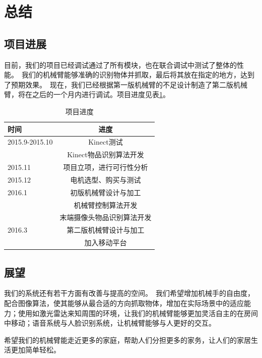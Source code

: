 \section{总结}

\subsection{项目进展}

目前，我们的项目已经调试通过了所有模块，也在联合调试中测试了整体的性能。\ 我们的机械臂能够准确的识别物体并抓取，最后将其放在指定的地方，达到了预期效果。\ 现在，我们已经根据第一版机械臂的不足设计制造了第二版机械臂，将在之后的一个月内进行调试。项目进度见表\ref{tab:progress}。

\renewcommand\arraystretch{1.2}
\begin{table}[H]
\centering
\begin{tabular}{l|c}
\hline
时间 & 进度 \\ \hline
2015.9-2015.10 & Kinect测试 \\
 & Kinect物品识别算法开发 \\ \hline
2015.11 & 项目立项，进行可行性分析 \\ \hline
2015.12 & 电机选型、购买与测试 \\ \hline
2016.1 & 初版机械臂设计与加工 \\
 & 机械臂控制算法开发 \\
 & 末端摄像头物品识别算法开发 \\ \hline
2016.3 & 第二版机械臂设计与加工 \\
 & 加入移动平台 \\ \hline
\end{tabular}
\caption{项目进度}
\label{tab:progress}
\end{table}

\newpage

\subsection{展望}

我们的系统还有若干方面有改善与提高的空间。\ 我们希望增加机械手的自由度，配合图像算法，使其能够从最合适的方向抓取物体，增加在实际场景中的适应能力；使用如激光雷达来知周围的环境，让我们的机械臂能够更加灵活自主的在房间中移动；语音系统与人脸识别系统，让机械臂能够与人更好的交互。

希望我们的机械臂能走近更多的家庭，帮助人们分担更多的家务，让人们的家居生活更加简单轻松。
